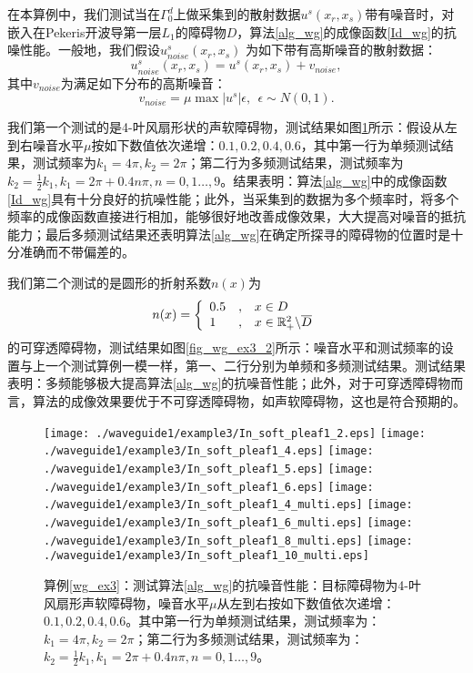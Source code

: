 \begin{example}[抗噪性测试]\label{wg_ex3}
在本算例中，我们测试当在$\Gamma_0^d$上做采集到的散射数据$u^s(x_r,x_s)$带有噪音时，对嵌入在Pekeris开波导第一层$L_1$的障碍物$D$，算法\ref{alg_wg}的成像函数\eqref{Id_wg}的抗噪性能。一般地，我们假设$u^s_{noise}(x_r,x_s)$ 为如下带有高斯噪音的散射数据：
$$ u^s_{noise}(x_r,x_s)=u^s(x_r,x_s)+v_{noise},$$
其中$v_{noise}$为满足如下分布的高斯噪音：
$$v_{noise}=\mu \max{|u^s|}\epsilon,\ \ \epsilon\sim N(0,1).$$

我们第一个测试的是4-叶风扇形状的声软障碍物，测试结果如图\ref{fig_wg_ex3_1}所示：假设从左到右噪音水平$\mu$按如下数值依次递增：$0.1,0.2,0.4,0.6$，其中第一行为单频测试结果，测试频率为$k_1=4\pi,k_2=2\pi$；第二行为多频测试结果，测试频率为$k_2=\frac{1}{2}k_1,k_1=2\pi+0.4n\pi,n=0,1\ldots,9$。结果表明：算法\ref{alg_wg}中的成像函数\ref{Id_wg}具有十分良好的抗噪性能；此外，当采集到的数据为多个频率时，将多个频率的成像函数直接进行相加，能够很好地改善成像效果，大大提高对噪音的抵抗能力；最后多频测试结果还表明算法\ref{alg_wg}在确定所探寻的障碍物的位置时是十分准确而不带偏差的。

我们第二个测试的是圆形的折射系数$n(x)$为
\begin{eqnarray*}
	n(x)=\left\{
	\begin{array}{lll}
		0.5&,&x\in D\\
		1&,&x\in\mathbb{R}_+^2\backslash\overline D
	\end{array}
	\right.
\end{eqnarray*}
的可穿透障碍物，测试结果如图\ref{fig_wg_ex3_2}所示：噪音水平和测试频率的设置与上一个测试算例一模一样，第一、二行分别为单频和多频测试结果。测试结果表明：多频能够极大提高算法\ref{alg_wg}的抗噪音性能；此外，对于可穿透障碍物而言，算法的成像效果要优于不可穿透障碍物，如声软障碍物，这也是符合预期的。
\end{example}
\begin{figure}[htbp]
  \centering
  \texttt{[image: ./waveguide1/example3/In\_soft\_pleaf1\_2.eps]}
  \texttt{[image: ./waveguide1/example3/In\_soft\_pleaf1\_4.eps]}
  \texttt{[image: ./waveguide1/example3/In\_soft\_pleaf1\_5.eps]}
  \texttt{[image: ./waveguide1/example3/In\_soft\_pleaf1\_6.eps]}
  \texttt{[image: ./waveguide1/example3/In\_soft\_pleaf1\_4\_multi.eps]}
  \texttt{[image: ./waveguide1/example3/In\_soft\_pleaf1\_6\_multi.eps]}
  \texttt{[image: ./waveguide1/example3/In\_soft\_pleaf1\_8\_multi.eps]}
  \texttt{[image: ./waveguide1/example3/In\_soft\_pleaf1\_10\_multi.eps]}
  \caption{算例\ref{wg_ex3}：测试算法\ref{alg_wg}的抗噪音性能：目标障碍物为4-叶风扇形声软障碍物，噪音水平$\mu$从左到右按如下数值依次递增：$0.1,0.2,0.4,0.6$。其中第一行为单频测试结果，测试频率为：$k_1=4\pi,k_2=2\pi$；第二行为多频测试结果，测试频率为：$k_2=\frac{1}{2}k_1,k_1=2\pi+0.4n\pi,n=0,1\ldots,9$。}\label{fig_wg_ex3_1}
\end{figure}
